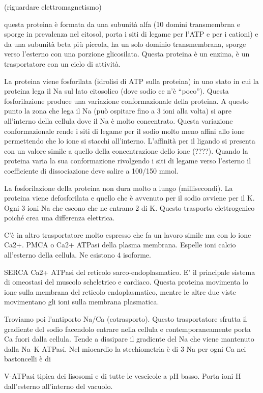 \documentclass[]{article}
\begin{document}
(riguardare elettromagnetismo)

questa proteina è formata da una subunità alfa (10 domini transmembrna e
sporge in prevalenza nel citosol, porta i siti di legame per l'ATP e per
i cationi) e da una subunità beta più piccola, ha un solo dominio
transmembrana, sporge verso l'esterno con una porzione glicosilata.
Questa proteina è un enzima, è un trasportatore con un ciclo di
attività.

La proteina viene fosforilata (idrolisi di ATP sulla proteina) in uno
stato in cui la proteina lega il Na sul lato citosolico (dove sodio ce
n'è ``poco''). Questa fosforilazione produce una variazione
conformazionale della proteina. A questo punto la zona che lega il Na
(può ospitare fino a 3 ioni alla volta) si apre all'interno della
cellula dove il Na è molto concentrato. Questa variazione
conformazionale rende i siti di legame per il sodio molto meno affini
allo ione permettendo che lo ione si stacchi all'interno. L'affinità per
il ligando si presenta con un valore simile a quello della
concentrazione dello ione (????). Quando la proteina varia la sua
conformazione rivolgendo i siti di legame verso l'esterno il
coefficiente di dissociazione deve salire a 100/150 mmol.

La fosforilazione della proteina non dura molto a lungo (millisecondi).
La proteina viene defosforilata e quello che è avvenuto per il sodio
avviene per il K. Ogni 3 ioni Na che escono che ne entrano 2 di K.
Questo trasporto elettrogenico poiché crea una differenza elettrica.

C'è in altro trasportatore molto espresso che fa un lavoro simile ma con
lo ione Ca2+. PMCA o Ca2+ ATPasi della plasma membrana. Espelle ioni
calcio all'esterno della cellula. Ne esistono 4 isoforme.

SERCA Ca2+ ATPasi del reticolo sarco-endoplasmatico. E' il principale
sistema di omeostasi del muscolo scheletrico e cardiaco. Questa proteina
movimenta lo ione sulla membrana del reticolo endoplasmatico, mentre le
altre due viste movimentano gli ioni sulla membrana plasmatica.

Troviamo poi l'antiporto Na/Ca (cotrasporto). Questo trasportatore
sfrutta il gradiente del sodio facendolo entrare nella cellula e
contemporaneamente porta Ca fuori dalla cellula. Tende a dissipare il
gradiente del Na che viene mantenuto dalla Na--K ATPasi. Nel miocardio
la stechiometria è di 3 Na per ogni Ca nei bastoncelli è di

V-ATPasi tipica dei lisosomi e di tutte le vescicole a pH basso. Porta
ioni H dall'esterno all'interno del vacuolo.
\end{document}
